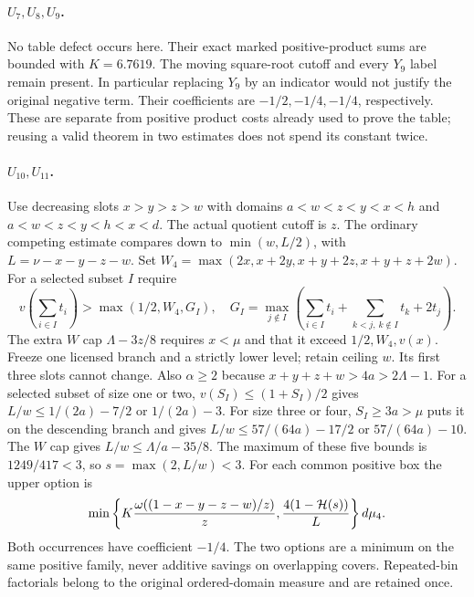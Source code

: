 \documentclass[11pt]{article}
\newcommand{\HH}{\mathcal H}
\begin{document}
\paragraph{$U_7,U_8,U_9$.}
No table defect occurs here. Their exact marked positive-product sums
are bounded with $K=6.7619$. The moving square-root cutoff and every
$Y_9$ label remain present. In particular replacing $Y_9$ by an indicator
would not justify the original negative term. Their coefficients are
$-1/2,-1/4,-1/4$, respectively. These are separate from positive
product costs already used to prove the table; reusing a valid theorem
in two estimates does not spend its constant twice.

\paragraph{$U_{10},U_{11}$.}
Use decreasing slots $x>y>z>w$ with domains
$a<w<z<y<x<h$ and $a<w<z<y<h<x<d$. The actual quotient cutoff
is $z$. The ordinary competing estimate compares down to
$\min(w,L/2)$, with $L=\nu-x-y-z-w$.
Set $W_4=\max(2x,x+2y,x+y+2z,x+y+z+2w)$.
For a selected subset $I$ require
\[
 v(\sum_{i\in I}t_i)>\max(1/2,W_4,G_I),\quad
 G_I=\max_{j\notin I}\left(\sum_{i\in I}t_i+
                  \sum_{k<j,\,k\notin I}t_k+2t_j\right).
\]
The extra $W$ cap $\Lambda-3z/8$ requires $x<\mu$ and that it
exceed $1/2,W_4,v(x)$. Freeze one licensed branch and a strictly lower
level; retain ceiling $w$. Its first three slots cannot change.
Also $\alpha\ge2$ because $x+y+z+w>4a>2\Lambda-1$.
For a selected subset of size one or two, $v(S_I)\le(1+S_I)/2$
gives $L/w\le1/(2a)-7/2$ or $1/(2a)-3$. For size three or four,
$S_I\ge3a>\mu$ puts it on the descending branch and gives
$L/w\le57/(64a)-17/2$ or $57/(64a)-10$. The $W$ cap gives
$L/w\le\Lambda/a-35/8$. The maximum of these five bounds is
$1249/417<3$, so $s=\max(2,L/w)<3$.
For each common positive box the upper option is
\[
 \min\left\{K{\omega((1-x-y-z-w)/z)\over z},
                  {4(1-\HH(s))\over L}\right\}d\mu_4.
\]
Both occurrences have coefficient $-1/4$. The two options are a
minimum on the same positive family, never additive savings on
overlapping covers. Repeated-bin factorials belong to the original
ordered-domain measure and are retained once.
\end{document}
